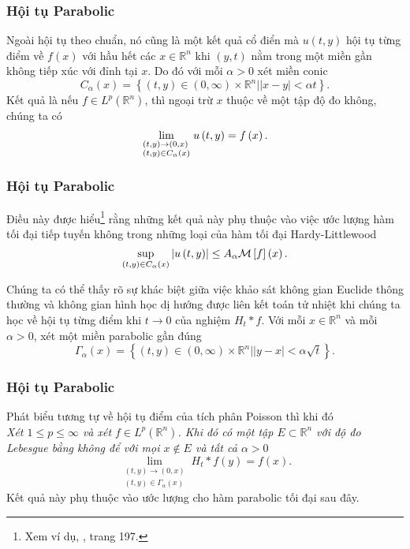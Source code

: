 \documentclass[11pt]{beamer}
\numberwithin{equation}{section}
\theoremstyle{plain}
\theoremstyle{definition}
\theoremstyle{remark}
\begin{document}
\begin{frame}\frametitle{Hội tụ Parabolic}
Ngoài hội tụ theo chuẩn, nó cũng là một kết quả cổ điển mà $u\left(t,y\right)$ hội tụ từng điểm về $f\left(x\right)$ với hầu hết các $x\in\mathbb{R}^n$ khi $\left(y,t\right)$ nằm trong một miền gần không tiếp xúc với đỉnh tại $x$. Do đó với mỗi $\alpha>0$ xét miền conic
\[{C_\alpha }\left( x \right) = \left\{ {\left( {t,y} \right) \in \left( {0,\infty } \right) \times {\mathbb{R}^n}|\left| {x - y} \right| < \alpha t} \right\}.\]
Kết quả là nếu $f\in L^{p}\left(\mathbb{R}^{n}\right)$, thì ngoại trừ $x$ thuộc về một tập độ đo không, chúng ta có 
\[\mathop {\lim }\limits_{\scriptstyle\left( {t,y} \right) \to \left( {0,x} \right)\hfill\atop
\scriptstyle\left( {t,y} \right) \in {C_\alpha }\left( x \right)\hfill} u\left( {t,y} \right) = f\left( x \right).\]
\end{frame}
\begin{frame}\frametitle{Hội tụ Parabolic}
Điều này được hiểu\footnote{Xem ví dụ, \textbf{\cite{Ste70}}, trang 197.} rằng những kết quả này phụ thuộc vào việc ước lượng hàm tối đại tiếp tuyến không trong những loại của hàm tối đại Hardy-Littlewood
\[\mathop {\sup }\limits_{\left( {t,y} \right) \in {C_\alpha }\left( x \right)} \left| {u\left( {t,y} \right)} \right| \le {A_\alpha }{\cal M}\left[ f \right]\left( x \right).\]

Chúng ta có thể thấy rõ sự khác biệt giữa việc khảo sát không gian Euclide thông thường và không gian hình học dị hướng được liên kết toán tử nhiệt khi chúng ta học về hội tụ từng điểm khi $t\to0$ của nghiệm ${H_t}*f$. Với mỗi $x\in\mathbb{R}^{n}$ và mỗi $\alpha>0$, xét một miền parabolic gần đúng
\[{\Gamma _\alpha }\left( x \right) = \left\{ {\left( {t,y} \right) \in \left( {0,\infty } \right) \times {\mathbb{R}^n}|\left| {y - x} \right| < \alpha \sqrt t } \right\}.\]

\end{frame}
\begin{frame}\frametitle{Hội tụ Parabolic}
Phát biểu tương tự về hội tụ điểm của tích phân Poisson thì khi đó \\
\textit{Xét $1\le p\le\infty$ và xét $f\in L^{p}\left(\mathbb{R}^{n}\right)$. Khi đó có một tập $E\subset\mathbb{R}^n$ với độ đo Lebesgue bằng không để với mọi $x\notin E$ và tất cả $\alpha>0$
\[\mathop {\lim }\limits_{\begin{array}{*{20}{c}}
{\left( {t,y} \right) \to \left( {0,x} \right)}\\
{\left( {t,y} \right) \in {\Gamma _\alpha }\left( x \right)}
\end{array}} {H_t}*f\left( y \right) = f\left( x \right).\]}
Kết quả này phụ thuộc vào ước lượng cho hàm parabolic tối đại sau đây.

\end{frame}
\end{document}
